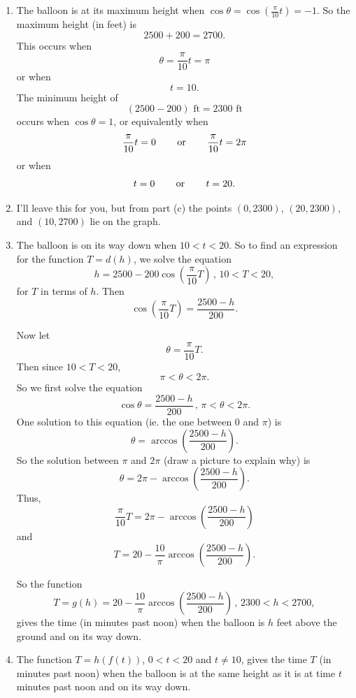 \documentclass{ximera}
\begin{document}
\begin{question}
\begin{explanation}
\begin{enumerate}
\item The balloon is at its maximum height when $\cos\theta = \cos (\frac{\pi}{10}t) = -1$. So the maximum height (in feet) is
\[
   2500 + 200 = 2700.
\] 
This occurs when
\[
   \theta = \frac{\pi}{10}t = \pi
\]
or when
\[
 t = 10.
\]
The minimum height of
\[
   (2500 - 200)\text{ ft} = 2300\text{ ft}
\]
occurs when $\cos\theta = 1$, or equivalently when
\[
   \frac{\pi}{10}t = 0 \hskip 0.3 in \text{or} \hskip 0.3in  \frac{\pi}{10}t = 2\pi
\]
or when
\[
  t = 0 \hskip 0.3 in \text{or} \hskip 0.3in t=20.
\]

\item I'll leave this for you, but from part (c) the points $(0,2300)$, $(20,2300)$, and $(10,2700)$ lie on the graph.

\item The balloon is on its way down when $10 < t < 20$. So to find an expression for the function $T=d(h)$, we solve the equation 
\[
     h = 2500 - 200 \cos \left(  \frac{\pi}{10}T \right) \, , \, 10 < T <20,
\]
for $T$ in terms of $h$. Then
\[
   \cos \left(  \frac{\pi}{10}T  \right) = \frac{2500-h}{200}.
\]

Now let 
\[
  \theta = \frac{\pi}{10}T.
\]
Then since $10 < T <20$,
\[
          \pi < \theta < 2\pi.
\]
So we first solve the equation
\[
  \cos \theta = \frac{2500-h}{200} \, , \, \pi < \theta < 2\pi.
\]
One solution to this equation (ie. the one between $0$ and $\pi$) is
\[
    \theta = \arccos\left(  \frac{2500-h}{200} \right).
\]
So the solution between $\pi$ and $2\pi$ (draw a picture to explain why) is
\[
     \theta = 2\pi - \arccos\left(  \frac{2500-h}{200} \right).
\]
Thus,
\[
  \frac{\pi}{10}T = 2\pi - \arccos\left(  \frac{2500-h}{200} \right)
\]
and
\[
  T = 20 - \frac{10}{\pi} \arccos\left(  \frac{2500-h}{200} \right).
\]

So the function
\[   
  T = g(h) = 20 - \frac{10}{\pi} \arccos\left(  \frac{2500-h}{200} \right) \, , \, 2300 < h < 2700,
\]
gives the time (in minutes past noon) when the balloon is $h$ feet above the ground and on its way down.

\item The function $T=h(f(t))$, $0 <  t  < 20$ and $t\neq 10$, gives the time $T$ (in minutes past noon) when the balloon is at the same height as it is at time $t$ minutes past noon and on its way down.



\end{enumerate}
\end{explanation}
\end{question}
\end{document}
